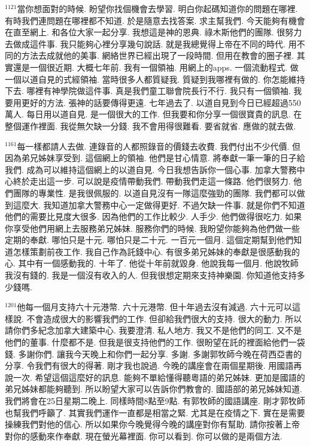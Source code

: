 \documentclass{book}
\begin{document}
$^{1121}$當你想面對的時候.
盼望你找個機會去學習.
明白你起碼知道你的問題在哪裡.
有時我們連問題在哪裡都不知道.
於是隨意去找答案.
求主幫我們.
今天能夠有機會在直至網上.
和各位大家一起分享.
我想這是神的恩典.
祿木斯他們的團隊.
很努力去做成這件事.
我只能夠心裡分享幾句說話.
就是我總覺得上帝在不同的時代.
用不同的方法去成就他的美事.
網絡世界已經出現了一段時間.
但用在教會的圈子裡.
其實還是一個很近期.
大概七年前.
我有一個領袖.
用網上的apps.
一個流動程式.
做一個以道自見的式經領袖.
當時很多人都質疑我.
質疑到我哪裡有做的.
你怎能維持下去.
哪裡有神學院做這件事.
真是我們童工聯會院長行不行.
我只有一個領袖.
我要用更好的方法.
張神的話要傳得更遠.
七年過去了.
以道自見到今日已經超過550萬人.
每日用以道自見.
是一個很大的工作.
但我要和你分享一個很寶貴的訊息.
在整個運作裡面.
我從無欠缺一分錢.
我不會用得很難看.
要省就省.
應做的就去做.

$^{1161}$每一樣都請人去做.
連錄音的人都照錄音的價錢去收費.
我們付出不少代價.
但因為弟兄姊妹享受到.
這個網上的領袖.
他們是甘心情意.
將奉獻一筆一筆的日子給我們.
成為可以維持這個網上的以道自見.
今日我想告訴你一個心事.
加拿大警務中心終於走出這一步.
可以說是疫情帶動我們.
帶動我們走這一條路.
他們很努力.
他們團隊的專業性.
是我很佩服的.
以道自見沒有一隊這麼強勁的團隊.
我們都可以做到這麼大.
我知道加拿大警務中心一定做得更好.
不過欠缺一件事.
就是你們不知道他們的需要比見度大很多.
因為他們的工作比較少.
人手少.
他們做得很吃力.
如果你享受他們用網上去服務弟兄姊妹.
服務你們的時候.
我盼望你能夠為他們做一些定期的奉獻.
哪怕只是十元.
哪怕只是二十元.
一百元一個月.
這個定期幫到他們知道怎樣策劃前夜工作.
我自己作為託錢中心.
有很多弟兄姊妹的奉獻是很感動我的心.
其中有一個感動我的.
十年了.
他從十年前就毀身.
他說我每一個月.
他說牧師我沒有錢的.
我是一個沒有收入的人.
但我很想定期來支持神樂園.
你知道他支持多少錢嗎.

$^{1201}$他每一個月支持六十元港幣.
六十元港幣.
但十年過去沒有減過.
六十元可以這樣說.
不會造成很大的影響我們的工作.
但卻給我們很大的支持.
很大的動力.
所以請你們多紀念加拿大建築中心.
我要澄清.
私人地方.
我又不是他們的同工.
又不是他們的董事.
什麼都不是.
但我是很支持他們的工作.
很盼望在託的裡面給他們一袋錢.
多謝你們.
讓我今天晚上和你們一起分享.
多謝.
多謝郭牧師今晚在荷西亞書的分享.
令我們有很大的得著.
剛才我也說過.
今晚的講座會在兩個星期後.
用國語再說一次.
希望這個這麼好的訊息.
能夠不單給懂得聽粵語的弟兄姊妹.
更加是國語的弟兄姊妹都能夠聽到.
所以盼望大家可以告訴你們教會的.
國語部的弟兄姊妹知道.
我們將會在25日星期二晚上.
同樣時間8點至9點.
有郭牧師的國語講座.
剛才郭牧師也幫我們呼籲了.
其實我們運作一直都是相當之緊.
尤其是在疫情之下.
實在是需要操練我們對他的信心.
所以如果你今晚覺得今晚的講座對你有幫助.
請你按著上帝對你的感動來作奉獻.
現在螢光幕裡面.
你可以看到.
你可以做的是兩個方法.
\end{document}
